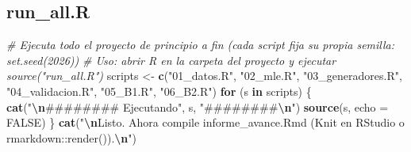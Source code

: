 \documentclass[
  spanish,
]{article}
\newenvironment{Shaded}{\begin{snugshade}}{\end{snugshade}}
\newcommand{\AttributeTok}[1]{\textcolor[rgb]{0.13,0.29,0.53}{#1}}
\newcommand{\CommentTok}[1]{\textcolor[rgb]{0.56,0.35,0.01}{\textit{#1}}}
\newcommand{\ConstantTok}[1]{\textcolor[rgb]{0.56,0.35,0.01}{#1}}
\newcommand{\ControlFlowTok}[1]{\textcolor[rgb]{0.13,0.29,0.53}{\textbf{#1}}}
\newcommand{\FunctionTok}[1]{\textcolor[rgb]{0.13,0.29,0.53}{\textbf{#1}}}
\newcommand{\NormalTok}[1]{#1}
\newcommand{\OtherTok}[1]{\textcolor[rgb]{0.56,0.35,0.01}{#1}}
\newcommand{\SpecialCharTok}[1]{\textcolor[rgb]{0.81,0.36,0.00}{\textbf{#1}}}
\newcommand{\StringTok}[1]{\textcolor[rgb]{0.31,0.60,0.02}{#1}}
\begin{document}
\subsection{run\_all.R}\label{run_all.r}

\begin{Shaded}
\begin{Highlighting}[]
\CommentTok{\# Ejecuta todo el proyecto de principio a fin (cada script fija su propia semilla: set.seed(2026))}
\CommentTok{\# Uso: abrir R en la carpeta del proyecto y ejecutar  source("run\_all.R")}
\NormalTok{scripts }\OtherTok{\textless{}{-}} \FunctionTok{c}\NormalTok{(}\StringTok{"01\_datos.R"}\NormalTok{, }\StringTok{"02\_mle.R"}\NormalTok{, }\StringTok{"03\_generadores.R"}\NormalTok{, }\StringTok{"04\_validacion.R"}\NormalTok{,}
             \StringTok{"05\_B1.R"}\NormalTok{, }\StringTok{"06\_B2.R"}\NormalTok{)}
\ControlFlowTok{for}\NormalTok{ (s }\ControlFlowTok{in}\NormalTok{ scripts) \{}
  \FunctionTok{cat}\NormalTok{(}\StringTok{"}\SpecialCharTok{\textbackslash{}n}\StringTok{\#\#\#\#\#\#\#\# Ejecutando"}\NormalTok{, s, }\StringTok{"\#\#\#\#\#\#\#\#}\SpecialCharTok{\textbackslash{}n}\StringTok{"}\NormalTok{)}
  \FunctionTok{source}\NormalTok{(s, }\AttributeTok{echo =} \ConstantTok{FALSE}\NormalTok{)}
\NormalTok{\}}
\FunctionTok{cat}\NormalTok{(}\StringTok{"}\SpecialCharTok{\textbackslash{}n}\StringTok{Listo. Ahora compile \textquotesingle{}informe\_avance.Rmd\textquotesingle{} (Knit en RStudio o rmarkdown::render()).}\SpecialCharTok{\textbackslash{}n}\StringTok{"}\NormalTok{)}
\end{Highlighting}
\end{Shaded}
\end{document}
